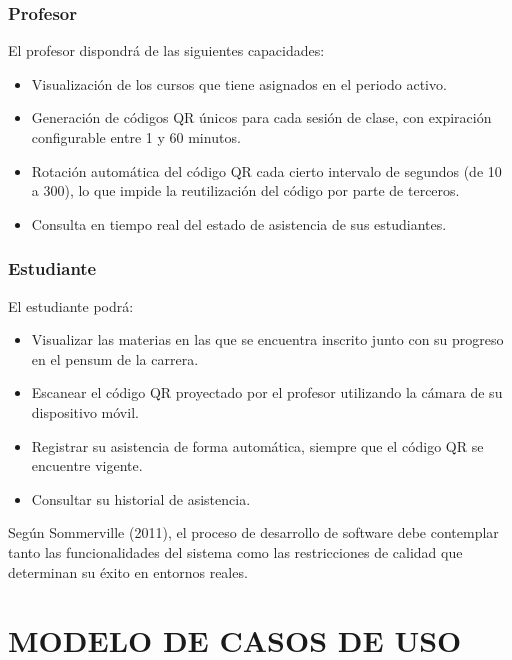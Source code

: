 \documentclass[12pt, letterpaper, oneside]{report}
\begin{document}
\subsection{Profesor}

El profesor dispondr\'a de las siguientes capacidades:

\begin{itemize}
  \item Visualizaci\'on de los cursos que tiene asignados en el periodo activo.
  \item Generaci\'on de c\'odigos QR \'unicos para cada sesi\'on de clase, con expiraci\'on configurable entre 1 y 60 minutos.
  \item Rotaci\'on autom\'atica del c\'odigo QR cada cierto intervalo de segundos (de 10 a 300), lo que impide la reutilizaci\'on del c\'odigo por parte de terceros.
  \item Consulta en tiempo real del estado de asistencia de sus estudiantes.
\end{itemize}

\subsection{Estudiante}

El estudiante podr\'a:

\begin{itemize}
  \item Visualizar las materias en las que se encuentra inscrito junto con su progreso en el pensum de la carrera.
  \item Escanear el c\'odigo QR proyectado por el profesor utilizando la c\'amara de su dispositivo m\'ovil.
  \item Registrar su asistencia de forma autom\'atica, siempre que el c\'odigo QR se encuentre vigente.
  \item Consultar su historial de asistencia.
\end{itemize}

Seg\'un Sommerville (2011), el proceso de desarrollo de software debe contemplar tanto las funcionalidades del sistema como las restricciones de calidad que determinan su \'exito en entornos reales.

\newpage

\chapter{MODELO DE CASOS DE USO}
\end{document}
